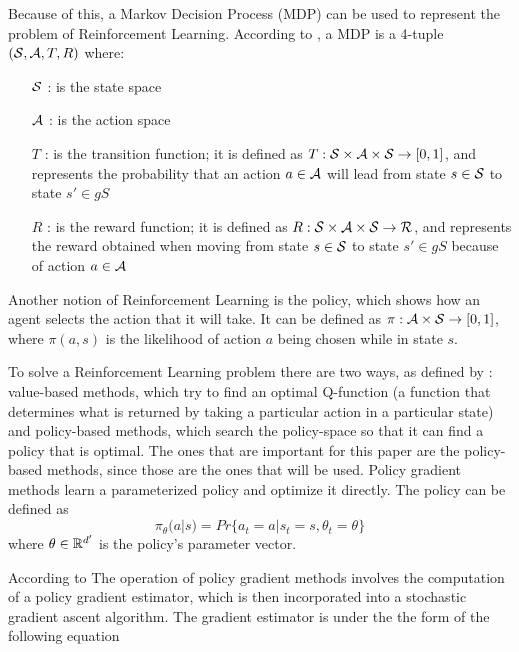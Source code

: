 Because of this, a Markov Decision Process (MDP) can be used to represent the problem of Reinforcement Learning. According to \cite{Bellman_MDP}, a MDP is a 4-tuple $({\mathcal{S}}, {\mathcal{A}}, T, R)$ where:
\begin{itemize}
    \item [${\mathcal{S}}$]: is the state space
    \item [${\mathcal{A}}$]: is the action space
    \item [$T$]: is the transition function; it is defined as $T: {\mathcal{S}} \times {\mathcal{A}} \times {\mathcal{S}} \rightarrow [0, 1]$, and represents the probability that an action $a \in {\mathcal{A}}$ will lead from state $s \in {\mathcal{S}}$ to state $s' \in gS$
    \item [$R$]: is the reward function; it is defined as $R: {\mathcal{S}} \times {\mathcal{A}} \times {\mathcal{S}} \rightarrow {\mathcal{R}}$, and represents the reward obtained when moving from state $s \in {\mathcal{S}}$ to state $s' \in gS$ because of action $a \in {\mathcal{A}}$
\end{itemize}

Another notion of Reinforcement Learning is the policy, which shows how an agent selects the action that it will take. It can be defined as $\pi: {\mathcal{A}} \times {\mathcal{S}} \rightarrow [0, 1]$, where $\pi(a, s)$ is the likelihood of action $a$ being chosen while in state $s$.

To solve a Reinforcement Learning problem there are two ways, as defined by \cite{yang2021overviewmultiagentrl}: value-based methods, which try to find an optimal Q-function (a function that determines what is returned by taking a particular action in a particular state) and policy-based methods, which search the policy-space so that it can find a policy that is optimal. The ones that are important for this paper are the policy-based methods, since those are the ones that will be used. Policy gradient methods learn a parameterized policy and optimize it directly. The policy can be defined as 
\begin{equation} \label{policy_eq:1}
    \pi_{\theta} (a | s) = Pr\{a_t = a | s_t = s, \theta_{t} = \theta\}
\end{equation}
where $\theta \in {\mathbb{R}}^{d'}$ is the policy's parameter vector.




According to \cite{schulman2017ppo} The operation of policy gradient methods involves the computation of a policy gradient estimator, which is then incorporated into a stochastic gradient ascent algorithm. The gradient estimator is under the the form of the following equation

